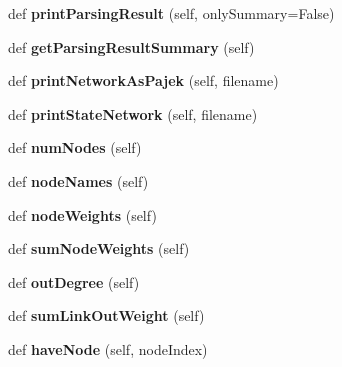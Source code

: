\begin{DoxyCompactItemize}
def {\bfseries print\+Parsing\+Result} (self, only\+Summary=False)
\item 
\mbox{\label{classinfomap_1_1Network_a0067f5980f795957cddefd4bd6b7d51c}} 
def {\bfseries get\+Parsing\+Result\+Summary} (self)
\item 
\mbox{\label{classinfomap_1_1Network_a462fe2ad18550b26a47b3ef75c53c12d}} 
def {\bfseries print\+Network\+As\+Pajek} (self, filename)
\item 
\mbox{\label{classinfomap_1_1Network_af9b928db01ecad4ed010b21421f7ed3d}} 
def {\bfseries print\+State\+Network} (self, filename)
\item 
\mbox{\label{classinfomap_1_1Network_a5f95d973b0d79d4daaed2a51833a6bb0}} 
def {\bfseries num\+Nodes} (self)
\item 
\mbox{\label{classinfomap_1_1Network_a038d74568f04d1d14e94000f2286d952}} 
def {\bfseries node\+Names} (self)
\item 
\mbox{\label{classinfomap_1_1Network_a91ff550075999e20b0ff72131434959c}} 
def {\bfseries node\+Weights} (self)
\item 
\mbox{\label{classinfomap_1_1Network_a2be1580a45eac55e1f16788b301c0ef3}} 
def {\bfseries sum\+Node\+Weights} (self)
\item 
\mbox{\label{classinfomap_1_1Network_a9916e86d3233534371485bb7d0ca4d1a}} 
def {\bfseries out\+Degree} (self)
\item 
\mbox{\label{classinfomap_1_1Network_a58ce1ff1396566fa640261e95a3f53e9}} 
def {\bfseries sum\+Link\+Out\+Weight} (self)
\item 
\mbox{\label{classinfomap_1_1Network_adc2c6dfaf6437d5d5e154cf7e110c28a}} 
def {\bfseries have\+Node} (self, node\+Index)
\item 
\mbox{\label{classinfomap_1_1Network_a354f97a294346f416bb1868753ded8b1}} 

\end{DoxyCompactItemize}
